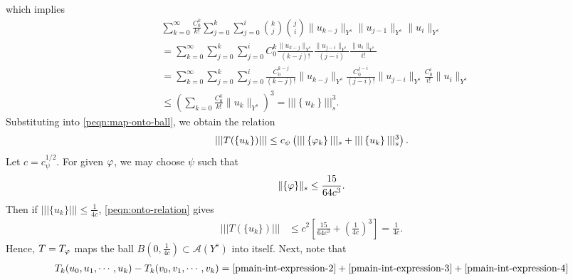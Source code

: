 %
%
which implies 
%
%
\begin{equation}
\begin{split}
  & \sum_{k=0}^{\infty} \frac{C_0^k}{k!} \sum_{j=0}^{k}  \sum_{j=0}^{i} {k \choose j } {j \choose i } \|u_{k-j}\|_{Y^s}
\| u_{j-1}\|_{Y^s} \| u_{i} \|_{Y^s} 
\\
& = \sum_{k=0}^{\infty} \sum_{j=0}^{k}  \sum_{j=0}^{i} C_{0}^{k} \frac{\|
u_{k-j} \|_{Y^s}}{(k-j)!} \frac{\| u_{j-i} \|_{Y^s}}{(j-i)} \frac{\|
u_{i} \|_{Y^s}}{i!}
\\
& = \sum_{k=0}^{\infty} \sum_{j=0}^{k}  \sum_{j=0}^{i}
\frac{C_{0}^{k-j}}{(k-j)!} \| u_{k-j} \|_{Y^s} \frac{C_{0}^{j-i}}{(j-i)!}\|
u_{j-i} \|_{Y^s} \frac{C_{0}^{i}}{i!} \| u_{i} \|_{Y^s}
\\
& \le \left( \sum_{k=0} \frac{C_0^k}{k!} \| u_{k} \|_{Y^s} \right)^{3}
= | | | \left\{ u_{k} \right\} | | |^3_{s}.
\label{peqn:low-dim-to-high-comp}
\end{split}
\end{equation}
%
%
Substituting into \eqref{peqn:map-onto-ball}, we obtain the relation
%
%
\begin{equation}
\begin{split}
  | | | T(\left\{ u_{k} \right\}) | | |
  \le c_{\psi} \left( | | | \left\{ \varphi_{k} \right\} | | |_{s} +
  | | | \left\{ u_{k} \right\} | | |^3_{s} \right ).
\end{split}
\label{peqn:onto-relation}
\end{equation}
%
%
Let $c = c_{\psi}^{1/2}$. For given $\varphi$, we may choose $\psi$ such
that 
%
\begin{equation*}
  \begin{split}
    \|\{\varphi\}\|_{s} \le \frac{15}{64c^3}.
  \end{split}
\end{equation*}
%
Then if $| | |\{u_k\} | | | \le \frac{1}{4c}$, \eqref{peqn:onto-relation} gives
%
\begin{equation*}
  \begin{split}
    |  | |T (\{u_k \}) | | |
    & \le c^2 \left[ \frac{15}{64c^3} + \left( 
    \frac{1}{4c} \right)^3 \right]
    =  \frac{1}{4c}.
  \end{split}
\end{equation*}
%
Hence, $T=T_{\varphi}$ maps the ball $B\left( 0, \frac{1}{4c} \right) \subset
\mathcal{A}(Y^s)$ into 
itself. Next, note that
%
\begin{equation*}
  \begin{split}
    T_k(u_0, u_1,\cdots,u_k) - T_k(v_0, v_1, \cdots, v_k)
    = \eqref{pmain-int-expression-2} + \eqref{pmain-int-expression-3} 
    + \eqref{pmain-int-expression-4}
  \end{split}
\end{equation*}
